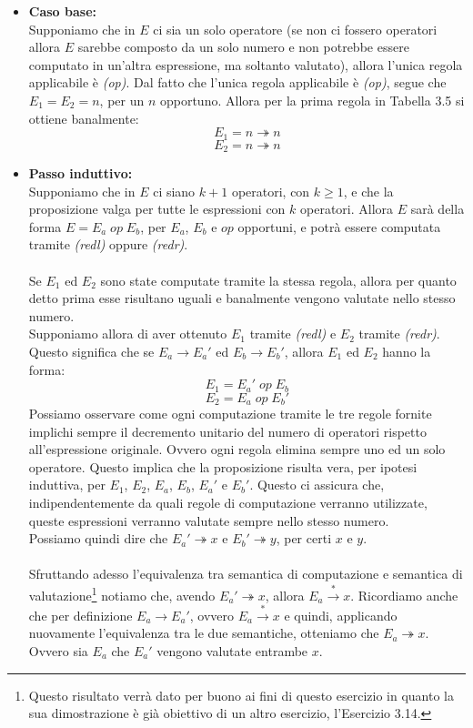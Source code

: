     \begin{itemize}
        \item \textbf{Caso base:}\\
            Supponiamo che in $E$ ci sia un solo operatore (se non ci fossero operatori allora $E$ sarebbe composto da un solo numero e non potrebbe essere computato in un'altra espressione, ma soltanto valutato), allora l'unica regola applicabile è \textit{(op)}. Dal fatto che l'unica regola applicabile è \textit{(op)}, segue che $E_1=E_2=n$, per un $n$ opportuno. Allora per la prima regola in Tabella 3.5 si ottiene banalmente:
            $$E_1 = n \twoheadrightarrow n$$
            $$E_2 = n \twoheadrightarrow n$$
        \item \textbf{Passo induttivo:}\\
            Supponiamo che in $E$ ci siano $k+1$ operatori, con $k \geq 1$, e che la proposizione valga per tutte le espressioni con $k$ operatori. Allora $E$ sarà della forma $E=E_a\; op\; E_b$, per $E_a$, $E_b$ e $op$ opportuni, e potrà essere computata tramite \textit{(redl)} oppure \textit{(redr)}.\\
            \\
            Se $E_1$ ed $E_2$ sono state computate tramite la stessa regola, allora per quanto detto prima esse risultano uguali e banalmente vengono valutate nello stesso numero.\\
            Supponiamo allora di aver ottenuto $E_1$ tramite \textit{(redl)} e $E_2$ tramite \textit{(redr)}. Questo significa che se $E_a \rightarrow E_a'$ ed $E_b \rightarrow E_b'$, allora $E_1$ ed $E_2$ hanno la forma:
            $$E_1 = E_a'\; op\; E_b$$
            $$E_2 = E_a\; op\; E_b'$$
            Possiamo osservare come ogni computazione tramite le tre regole fornite implichi sempre il decremento unitario del numero di operatori rispetto all'espressione originale. Ovvero ogni regola elimina sempre uno ed un solo operatore. Questo implica che la proposizione risulta vera, per ipotesi induttiva, per $E_1$, $E_2$, $E_a$, $E_b$, $E_a'$ e $E_b'$. Questo ci assicura che, indipendentemente da quali regole di computazione verranno utilizzate, queste espressioni verranno valutate sempre nello stesso numero.\\
            Possiamo quindi dire che $E_a' \twoheadrightarrow x$ e $E_b' \twoheadrightarrow y$, per certi $x$ e $y$.\\
            \\
            Sfruttando adesso l'equivalenza tra semantica di computazione e semantica di valutazione\footnote{Questo risultato verrà dato per buono ai fini di questo esercizio in quanto la sua dimostrazione è già obiettivo di un altro esercizio, l'Esercizio 3.14.} notiamo che, avendo $E_a' \twoheadrightarrow x$, allora $E_a \xrightarrow{*} x$. Ricordiamo anche che per definizione $E_a \rightarrow E_a'$, ovvero $E_a \xrightarrow{*} x$ e quindi, applicando nuovamente l'equivalenza tra le due semantiche, otteniamo che $E_a \twoheadrightarrow x$. Ovvero sia $E_a$ che $E_a'$ vengono valutate entrambe $x$.\\

\end{itemize}
